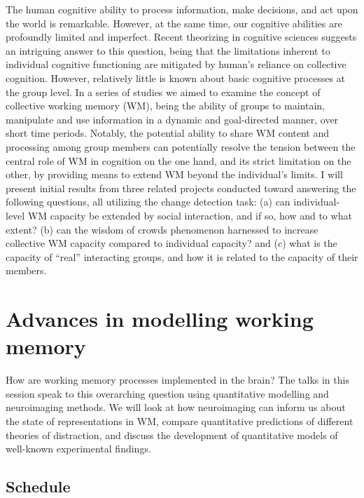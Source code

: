 \documentclass[12pt,]{book}
\begin{document}
The human cognitive ability to process information, make decisions, and act upon the world is remarkable. However, at the same time, our cognitive abilities are profoundly limited and imperfect. Recent theorizing in cognitive sciences suggests an intriguing answer to this question, being that the limitations inherent to individual cognitive functioning are mitigated by human's reliance on collective cognition. However, relatively little is known about basic cognitive processes at the group level. In a series of studies we aimed to examine the concept of collective working memory (WM), being the ability of groups to maintain, manipulate and use information in a dynamic and goal-directed manner, over short time periods. Notably, the potential ability to share WM content and processing among group members can potentially resolve the tension between the central role of WM in cognition on the one hand, and its strict limitation on the other, by providing means to extend WM beyond the individual's limits. I will present initial results from three related projects conducted toward answering the following questions, all utilizing the change detection task: (a) can individual-level WM capacity be extended by social interaction, and if so‚ how and to what extent? (b) can the wisdom of crowds phenomenon harnessed to increase collective WM capacity compared to individual capacity? and (c) what is the capacity of ``real'' interacting groups, and how it is related to the capacity of their members.

\hypertarget{advances-in-modelling-working-memory}{%
\chapter{Advances in modelling working memory}\label{advances-in-modelling-working-memory}}

How are working memory processes implemented in the brain? The talks in this session speak to this overarching question using quantitative modelling and neuroimaging methods. We will look at how neuroimaging can inform us about the state of representations in WM, compare quantitative predictions of different theories of distraction, and discuss the development of quantitative models of well-known experimental findings.

\hypertarget{schedule-5}{%
\section{Schedule}\label{schedule-5}}
\end{document}
